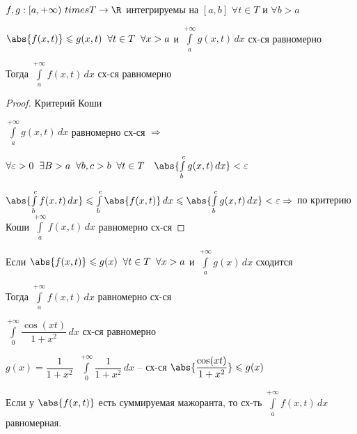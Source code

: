 
\begin{theorem}[Вейерштрасса]\thmslashn
	
	$f, g: [a, +\infty)\ times T \to \R$ интегрируемы на $[a, b]$ $\forall t \in T$ и $\forall b > a$
	
	$\abs{f(x, t)} \leqslant g(x, t) \;\; \forall t \in T \;\; \forall x > a$ и $\int\limits_{a}^{+\infty} g(x, t)\,dx$ сх-ся равномерно
	
	Тогда $\int\limits_{a}^{+\infty} f(x, t)\,dx$ сх-ся равномерно
	
\end{theorem}

\begin{proof}\thmslashn
	
	Критерий Коши 
	
	$\int\limits_{a}^{+\infty} g(x, t)\,dx$ равномерно сх-ся $\Rightarrow$ 
	
	$\forall \varepsilon > 0\;\; \exists B > a\;\; \forall b, c > b\;\; \forall t \in T \quad \abs{\int\limits_{b}^{c}g(x, t)\,dx} < \varepsilon$
	
	$\abs{\int\limits_{b}^{c}f(x, t)\,dx} \leqslant \int\limits_{b}^{c}\abs{f(x, t)}\,dx \leqslant \abs{\int\limits_{b}^{c}g(x, t)\,dx} < \varepsilon \Rightarrow$ по критерию Коши $\int\limits_{a}^{+\infty}f(x, t)\,dx$ равномерно сх-ся
	
\end{proof}

\begin{consequence}\thmslashn
	
	Если $\abs{f(x, t)}\leqslant g(x) \;\; \forall t \in T \;\; \forall x > a$ и $\int\limits_{a}^{+\infty} g(x)\,dx$ сходится
	
	Тогда $\int\limits_{a}^{+\infty}f(x, t)\,dx$ равномерно сх-ся
	
\end{consequence}

\begin{example}\thmslashn
	
	$\int\limits_{0}^{+\infty} \dfrac{\cos(xt)}{1 + x^2}\,dx$ сх-ся равномерно
	
	$g(x) = \dfrac{1}{1 + x^2} \;\; \int\limits_{0}^{+\infty} \dfrac{1}{1 + x^2}\,dx$ -- сх-ся $\abs{\dfrac{\cos(xt)}{1 + x^2}} \leqslant g(x)$
	
\end{example}

\begin{remark}\thmslashn
	
	Если у $\abs{f(x, t)}$ есть суммируемая мажоранта, то сх-ть $\int\limits_{a}^{+\infty}f(x, t)\,dx$ равномерная.
	
\end{remark}
